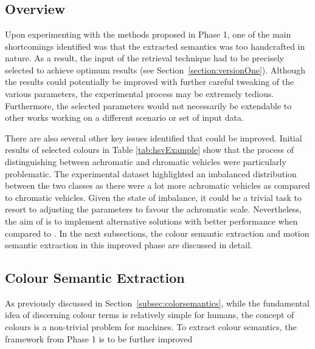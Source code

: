 \section{\versionTwoExt}
\label{section:semantic_chamfer}

\subsection{Overview}

Upon experimenting with the methods proposed in Phase 1, one of the main shortcomings identified was that the extracted semantics was too handcrafted in nature.
As a result, the input of the retrieval technique had to be precisely selected to achieve optimum results (see Section~\ref{section:versionOne}).
Although the results could potentially be improved with further careful tweaking of the various parameters, the experimental process may be extremely tedious.
Furthermore, the selected parameters would not necessarily be extendable to other works working on a different scenario or set of input data.

There are also several other key issues identified that could be improved.
Initial results of selected colours in Table \ref{tab:hsvExample} show that the process of distinguishing between achromatic and chromatic vehicles were particularly problematic.
The experimental dataset highlighted an imbalanced distribution between the two classes as there were a lot more achromatic vehicles as compared to chromatic vehicles.
Given the state of imbalance, it could be a trivial task to resort to adjusting the parameters to favour the achromatic scale.
Nevertheless, the aim of \versionTwoExt is to implement alternative solutions with better performance when compared to \versionOneExt. In the next subsections, the colour semantic extraction and motion semantic extraction in this improved phase are discussed in detail.


\subsection{Colour Semantic Extraction}
\label{section:versiontwoColor}
As previously discussed in Section~\ref{subsec:colorsemantics}, while the fundamental idea of discerning colour terms is relatively simple for humans, the concept of colours is a non-trivial problem for machines. To extract colour semantics, the framework from Phase 1 is to be further improved


